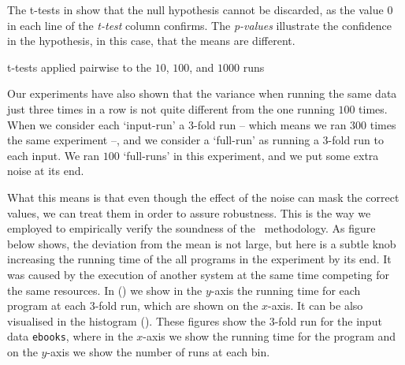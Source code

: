 The t-tests in  show that the null hypothesis cannot be discarded, as the value $0$ in each line of the \emph{t-test} column confirms. The \emph{p-values} illustrate the confidence in the hypothesis, in this case, that the means are different.

\begin{table}
  \centering
  \begin{tiny}
  
  \end{tiny}
  \caption{t-tests applied pairwise to the $10$, $100$, and $1000$ runs}
  \label{tab:ttest}
\end{table}


Our experiments have also shown that the variance when running the same data just three times in a row is not quite different from the one running $100$ times. When we consider each `input-run' a $3$-fold run -- which means we ran $300$ times the same experiment --, and we consider a `full-run' as running a $3$-fold run to each input. We ran $100$ `full-runs' in this experiment, and we put some extra noise at its end.

What this means is that even though the effect of the noise can mask the correct values, we can treat them in order to assure robustness. This is the way we employed to empirically verify the soundness of the \CP\ methodology. As figure  below shows, the deviation from the mean is not large, but here is a subtle knob increasing the running time of the all programs in the experiment by its end. It was caused by the execution of another system at the same time competing for the same resources. In () we show in the $y$-axis the running time for each program at each 3-fold run, which are shown on the $x$-axis. It can be also visualised in the histogram (). These figures show the $3$-fold run for the input data {\tt ebooks}, where in the $x$-axis we show the running time for the program and on the $y$-axis we show the number of runs at each bin.

